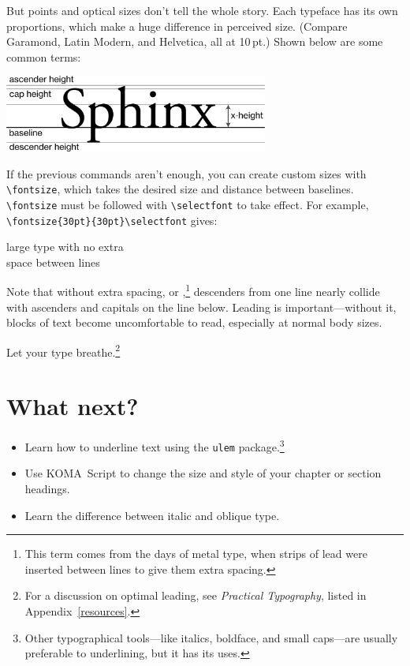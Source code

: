 But points and optical sizes don't tell the whole story.
Each typeface has its own proportions, which make a huge difference
in perceived size.
(Compare Garamond, { Latin Modern},
and {Helvetica}, all at 10\,pt.)
Shown below are some common terms:
\begin{centerfigure}
\includegraphics[keepaspectratio,width=0.65\textwidth]{heights.png}

\end{centerfigure}

If the previous commands aren't enough, you can create custom sizes with
\verb|\fontsize|, which takes the desired size and distance between baselines.
\verb|\fontsize| must be followed with \verb|\selectfont| to take effect.
For example, \verb|\fontsize{30pt}{30pt}\selectfont|
gives:
\begin{leftfigure}
\lm
\fontsize{30pt}{30pt}\selectfont
large type with no extra \\
space between lines
\end{leftfigure}
{\fontsize{10pt}{10pt}\selectfont
Note that without extra spacing,
or ,\punckern\footnote{This term comes from the days of
metal type, when strips of lead were inserted
between lines to give them extra spacing.}
descenders from one line nearly collide with ascenders and capitals on
the line below.
Leading is important---without it, blocks of text become uncomfortable to
read, especially at normal body sizes.\par}
Let your type breathe.\punckern\footnote{For a discussion on optimal leading,
see \textit{Practical Typography}, listed in Appendix~\ref{resources}.}

\section{What next?}
\begin{itemize}
\item Learn how to underline text using the \texttt{ulem}
    package.\punckern\footnote{Other typographical tools---like italics,
    boldface, and small caps---are usually preferable to underlining,
    but it has its uses.}
\item Use KOMA~Script to change the size and style of your chapter or section
    headings.
\item Learn the difference between italic and oblique type.
\end{itemize}
